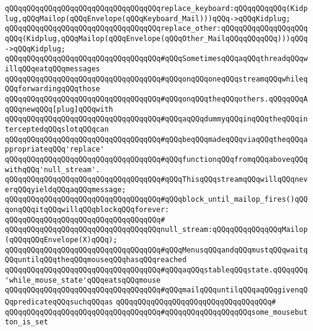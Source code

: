\verb|qQQqqQQqqQQqqQQqqQQqqQQqqQQqqQQqqQQqreplace_keyboard:qQQqqQQqqQQq(Kidplug,qQQqMailop(qQQqEnvelope(qQQqKeyboard_Mail)))qQQq->qQQqKidplug;|\newline
\verb|qQQqqQQqqQQqqQQqqQQqqQQqqQQqqQQqqQQqreplace_other:qQQqqQQqqQQqqQQqqQQqqQQq(Kidplug,qQQqMailop(qQQqEnvelope(qQQqOther_MailqQQqqQQqqQQq)))qQQq->qQQqKidplug;|\newline
\newline
\verb|qQQqqQQqqQQqqQQqqQQqqQQqqQQqqQQqqQQq#qQQqSometimesqQQqaqQQqthreadqQQqwillqQQqeatqQQqmessages|\newline
\verb|qQQqqQQqqQQqqQQqqQQqqQQqqQQqqQQqqQQq#qQQqonqQQqoneqQQqstreamqQQqwhileqQQqforwardingqQQqthose|\newline
\verb|qQQqqQQqqQQqqQQqqQQqqQQqqQQqqQQqqQQq#qQQqonqQQqtheqQQqothers.qQQqqQQqAqQQqnewqQQq[plug]qQQqwith|\newline
\verb|qQQqqQQqqQQqqQQqqQQqqQQqqQQqqQQqqQQq#qQQqaqQQqdummyqQQqinqQQqtheqQQqinterceptedqQQqslotqQQqcan|\newline
\verb|qQQqqQQqqQQqqQQqqQQqqQQqqQQqqQQqqQQq#qQQqbeqQQqmadeqQQqviaqQQqtheqQQqappropriateqQQq'replace'|\newline
\verb|qQQqqQQqqQQqqQQqqQQqqQQqqQQqqQQqqQQq#qQQqfunctionqQQqfromqQQqaboveqQQqwithqQQq'null_stream'.|\newline
\verb|qQQqqQQqqQQqqQQqqQQqqQQqqQQqqQQqqQQq#qQQqThisqQQqstreamqQQqwillqQQqneverqQQqyieldqQQqaqQQqmessage;|\newline
\verb|qQQqqQQqqQQqqQQqqQQqqQQqqQQqqQQqqQQq#qQQqblock_until_mailop_fires()qQQqonqQQqitqQQqwillqQQqblockqQQqforever:|\newline
\verb|qQQqqQQqqQQqqQQqqQQqqQQqqQQqqQQqqQQq#|\newline
\verb|qQQqqQQqqQQqqQQqqQQqqQQqqQQqqQQqqQQqnull_stream:qQQqqQQqqQQqqQQqMailop(qQQqqQQqEnvelope(X)qQQq);|\newline
\newline
\verb|qQQqqQQqqQQqqQQqqQQqqQQqqQQqqQQqqQQq#qQQqMenusqQQqandqQQqmustqQQqwaitqQQquntilqQQqtheqQQqmouseqQQqhasqQQqreached|\newline
\verb|qQQqqQQqqQQqqQQqqQQqqQQqqQQqqQQqqQQq#qQQqaqQQqstableqQQqstate.qQQqqQQq'while_mouse_state'qQQqeatsqQQqmouse|\newline
\verb|qQQqqQQqqQQqqQQqqQQqqQQqqQQqqQQqqQQq#qQQqmailqQQquntilqQQqaqQQqgivenqQQqpredicateqQQqsuchqQQqas|\newline
\verb|qQQqqQQqqQQqqQQqqQQqqQQqqQQqqQQqqQQq#|\newline
\verb|qQQqqQQqqQQqqQQqqQQqqQQqqQQqqQQqqQQq#qQQqqQQqqQQqqQQqqQQqsome_mousebutton_is_set|\newline
